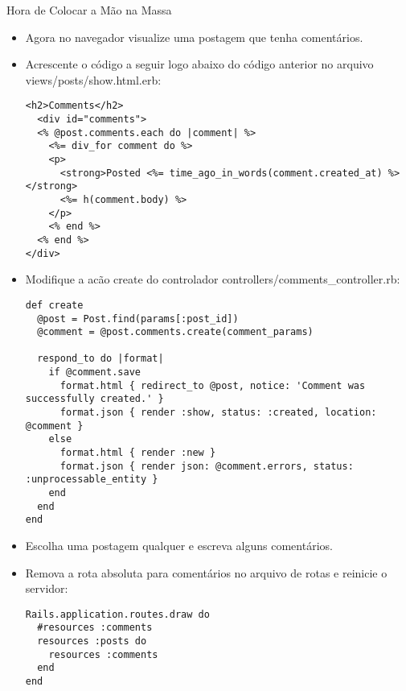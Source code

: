 \begin{frame}{Hora de Colocar a Mão na Massa}
\begin{itemize}
	\item Agora no navegador visualize uma postagem que tenha comentários.
	\item Acrescente o código a seguir logo abaixo do código anterior no arquivo \alert{views/posts/show.html.erb}:
	\begin{lstlisting}[style=RubyInputStyle]
<h2>Comments</h2>
  <div id="comments">
  <% @post.comments.each do |comment| %>
    <%= div_for comment do %>
    <p>
      <strong>Posted <%= time_ago_in_words(comment.created_at) %></strong>
      <%= h(comment.body) %>
    </p>
    <% end %>
  <% end %>
</div>
\end{lstlisting}

\item Modifique a acão create do controlador \alert{controllers/comments\_controller.rb}:
\begin{lstlisting}[style=RubyInputStyle]
def create
  @post = Post.find(params[:post_id])
  @comment = @post.comments.create(comment_params)

  respond_to do |format|
    if @comment.save
      format.html { redirect_to @post, notice: 'Comment was successfully created.' }
      format.json { render :show, status: :created, location: @comment }
    else
      format.html { render :new }
      format.json { render json: @comment.errors, status: :unprocessable_entity }
    end
  end
end 
\end{lstlisting}

\item Escolha uma postagem qualquer e escreva alguns comentários.

\item Remova a rota absoluta para comentários no arquivo de rotas e reinicie o servidor:
\begin{lstlisting}[style=RubyInputStyle, caption=config/routes.rb]
Rails.application.routes.draw do
  #resources :comments
  resources :posts do 
    resources :comments
  end 
end 
\end{lstlisting}	
	\end{itemize}
\end{frame}